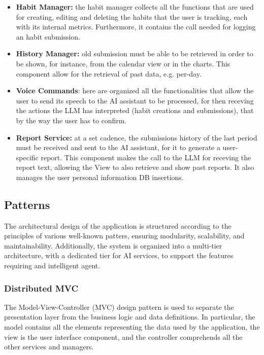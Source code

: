 \documentclass{article}
\begin{document}
\begin{itemize}
    \item \textbf{Habit Manager:} the habit manager collects all the functions that are used for creating, editing and deleting the habits that the user is tracking, each with its internal metrics. Furthermore, it contains the call needed for logging an habit submission.
    \item \textbf{History Manager:} old submission must be able to be retrieved in order to be shown, for instance, from the calendar view or in the charts. This component allow for the retrieval of past data, e.g. per-day.
    \item \textbf{Voice Commands}: here are organized all the functionalities that allow the user to send its speech to the AI assistant to be processed, for then receving the actions the LLM has interpreted (habit creations and submissions), that by the way the user has to confirm.
    \item \textbf{Report Service:} at a set cadence, the submissions history of the last period must be received and sent to the AI assistant, for it to generate a user-specific report. This component makes the call to the LLM for receving the report text, allowing the View to also retrieve and show past reports. It also manages the user personal information DB insertions.
\end{itemize}

\subsection{Patterns}

The architectural design of the application is structured according to the principles of various well-known patters, ensuring modularity, scalability, and maintainability.
Additionally, the system is organized into a multi-tier architecture, with a dedicated tier for AI services, to support the features requiring and intelligent agent.

\subsubsection{Distributed MVC}

The Model-View-Controller (MVC) design pattern is used to separate the presentation layer from the business logic and data definitions.
In particular, the model contains all the elements representing the data used by the application, the view is the user interface component, and the controller comprehends all the other services and managers.
\end{document}
